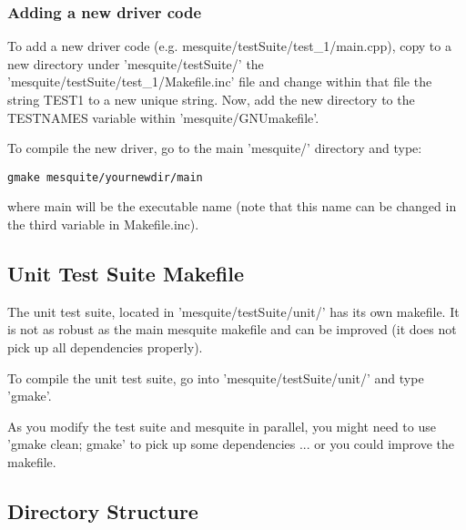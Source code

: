 \subsubsection{Adding a new driver code}

To add a new driver code (e.g. mesquite/testSuite/test\_1/main.cpp), 
copy to a new directory under 'mesquite/testSuite/' the
'mesquite/testSuite/test\_1/Makefile.inc' file and change 
within that file the string TEST1 to a new unique string. 
Now, add the new directory to the TESTNAMES variable within 
'mesquite/GNUmakefile'. 

To compile the new driver, go to the main 'mesquite/' directory and type:
\begin{verbatim}
gmake mesquite/yournewdir/main
\end{verbatim}
where main will be the executable name (note that this name can be 
changed in the third variable in Makefile.inc).


\subsection{Unit Test Suite Makefile}

The unit test suite, located in 'mesquite/testSuite/unit/' has its 
own makefile. It is not as robust as the main mesquite makefile and can 
be improved (it does not pick up all dependencies properly).

To compile the unit test suite, go into 'mesquite/testSuite/unit/' 
and type 'gmake'. 

As you modify the test suite and mesquite in parallel, you might 
need to use 'gmake clean; gmake' to pick up some dependencies ... 
or you could improve the makefile. 


\subsection{Directory Structure}

